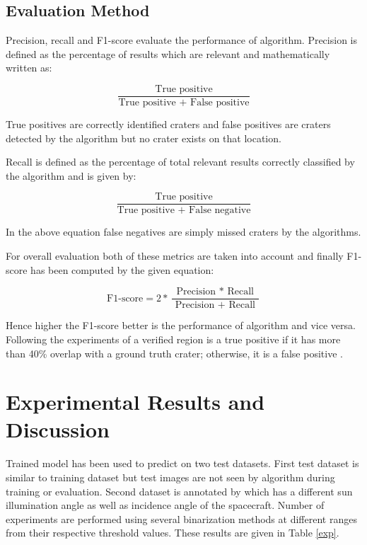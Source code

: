 \documentclass[11pt]{article}
\begin{document}
\subsection{Evaluation Method}
Precision, recall and F1-score evaluate the performance of algorithm. Precision is defined as the percentage of results which are relevant and mathematically written as:

\begin{equation*}
\frac{\text{True positive}}{\text{True positive + False positive}}
\end{equation*}

True positives are correctly identified craters and false positives are craters detected by the algorithm but no crater exists on that location.

Recall is defined as the percentage of total relevant results correctly classified by the algorithm and is given by:

\begin{equation*}
\frac{\text{True positive}}{\text{True positive + False negative}}
\end{equation*}

In the above equation false negatives are simply missed craters by the algorithms.

For overall evaluation both of these metrics are taken into account and finally F1-score has been computed by the given equation:

\begin{equation*}
\text{F1-score} =2 * \frac{\text { Precision } * \text { Recall }}{\text { Precision }+\text { Recall }}
\end{equation*}

Hence higher the F1-score better is the performance of algorithm and vice versa. Following the experiments of \cite{emami2015automatic} a verified region is a true positive if it has more than 40\% overlap with a ground truth crater; otherwise, it is a false positive .

\section{Experimental Results and Discussion}
Trained model has been used to predict on two test datasets. First test dataset is similar to training dataset but test images are not seen by algorithm during training or evaluation. Second dataset is annotated by \cite{dino2020} which has a different sun illumination angle as well as incidence angle of the spacecraft. Number of experiments are performed using several binarization methods at different ranges from their respective threshold values. These results are given in Table \ref{exp}.
\end{document}
